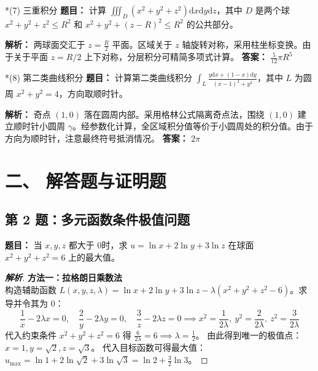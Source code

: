 \documentclass[11pt,a4paper]{article}
\newcommand{\dd}{\mathrm{d}}
\begin{document}
	\vspace{0.3cm}
	\begin{subsection}*{(7) 三重积分}
		\textbf{题目：} 计算 $\iiint_D (x^2+y^2+z^2) \dd x\dd y\dd z$，其中 $D$ 是两个球 $x^2+y^2+z^2 \le R^2$ 和 $x^2+y^2+(z-R)^2 \le R^2$ 的公共部分。
		
		\textbf{解析：} 两球面交汇于 $z = \frac{R}{2}$ 平面。区域关于 $z$ 轴旋转对称，采用柱坐标变换。由于关于平面 $z = R/2$ 上下对称，分层积分可精简多项式计算。
		\textbf{答案：} $\frac{5}{12}\pi R^5$
	\end{subsection}
	
	\vspace{0.3cm}
	\begin{subsection}*{(8) 第二类曲线积分}
		\textbf{题目：} 计算第二类曲线积分 $\int_L \frac{y \dd x + (1-x)\dd y}{(x-1)^2+y^2}$，其中 $L$ 为圆周 $x^2+y^2=4$，方向取顺时针。
		
		\textbf{解析：} 奇点 $(1,0)$ 落在圆周内部。采用格林公式隔离奇点法，围绕 $(1,0)$ 建立顺时针小圆周 $\gamma$。经参数化计算，全区域积分值等价于小圆周处的积分值。由于方向为顺时针，注意最终符号抵消情况。
		\textbf{答案：} $2\pi$
	\end{subsection}
	
	\newpage
	\section{二、 解答题与证明题}
	
	\begin{tcolorbox}[examstyle]
		\subsection*{第 2 题：多元函数条件极值问题}
		\textbf{题目：} 当 $x,y,z$ 都大于 $0$时，求 $u = \ln x + 2\ln y + 3\ln z$ 在球面 $x^2+y^2+z^2 = 6$ 上的最大值。
		
		\begin{proof}[\textbf{解析}]
			\textbf{方法一：拉格朗日乘数法} \\
			构造辅助函数 $L(x,y,z,\lambda) = \ln x + 2\ln y + 3\ln z - \lambda(x^2+y^2+z^2-6)$。求导并令其为 $0$：
			$$ \frac{1}{x} - 2\lambda x = 0, \quad \frac{2}{y} - 2\lambda y = 0, \quad \frac{3}{z} - 2\lambda z = 0 \implies x^2 = \frac{1}{2\lambda}, \ y^2 = \frac{2}{2\lambda}, \ z^2 = \frac{3}{2\lambda} $$
			代入约束条件 $x^2+y^2+z^2=6$ 得 $\frac{6}{2\lambda} = 6 \implies \lambda = \frac{1}{2}$。
			由此得到唯一的极值点：$x = 1, y = \sqrt{2}, z = \sqrt{3}$。
			代入目标函数可得最大值：$u_{\max} = \ln 1 + 2\ln\sqrt{2} + 3\ln\sqrt{3} = \ln 2 + \frac{3}{2}\ln 3$。
		\end{proof}
	\end{tcolorbox}
	
\end{document}
